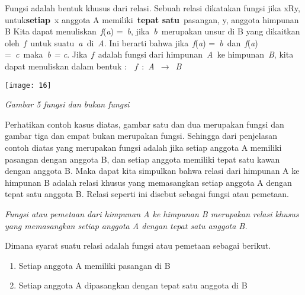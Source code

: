 \documentclass[11pt,fleqn]{book} %
\begin{document}
\noindent \textbf{}

Fungsi adalah bentuk khusus dari relasi. Sebuah relasi dikatakan fungsi jika xRy, untuk\textbf{setiap}~x anggota A memiliki~\textbf{tepat satu}~pasangan, y, anggota himpunan B Kita dapat menuliskan~\textit{f}(\textit{a}) =~\textit{b}, jika~\textit{b~}merupakan unsur di B yang dikaitkan oleh~\textit{f~}untuk suatu~\textit{a~}di~\textit{A}. Ini berarti bahwa jika~\textit{f}(\textit{a}) =~\textit{b~}dan~\textit{f}(\textit{a}) =~\textit{c~}maka~\textit{b = c}. Jika~\textit{f~}adalah fungsi dari himpunan~\textit{A~}ke himpunan~\textit{B}, kita dapat menuliskan dalam bentuk :~~\textit{f~}:~\textit{A~}$\mathrm{\to}$~\textit{B}

\noindent 

\begin{center}
\noindent \texttt{[image: 16]}
\end{center}

\noindent \textit{Gambar 5 fungsi dan bukan fungsi}

\noindent 

\noindent Perhatikan contoh kasus diatas, gambar satu dan dua merupakan fungsi dan gambar tiga dan empat bukan merupakan fungsi. Sehingga dari penjelasan contoh diatas yang merupakan fungsi adalah jika setiap anggota A memiliki pasangan dengan anggota B, dan setiap anggota memiliki tepat satu kawan dengan anggota B. Maka dapat kita simpulkan bahwa relasi dari himpunan A ke himpunan B adalah relasi khusus yang memasangkan setiap anggota A dengan tepat satu anggota B. Relasi seperti ini disebut sebagai fungsi atau pemetaan.

\noindent \textit{Fungsi atau pemetaan dari himpunan A ke himpunan B merupakan relasi khusus yang memasangkan setiap anggota A dengan tepat satu anggota B.}

\noindent Dimana syarat suatu relasi adalah fungsi atau pemetaan sebagai berikut.

\begin{enumerate}
\item  Setiap anggota A memiliki pasangan di B

\item  Setiap anggota A dipasangkan dengan tepat satu anggota di B
\end{enumerate}

\noindent 

\noindent 

\noindent 

\noindent 
\end{document}
